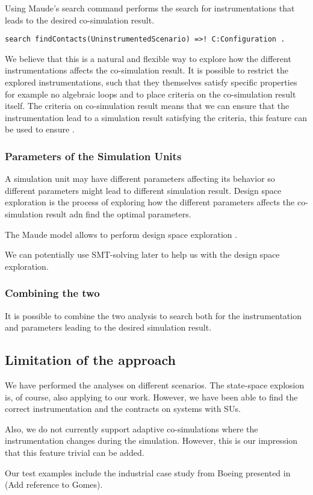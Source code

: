 Using Maude's search command performs the search for instrumentations that leads to the desired co-simulation result.

\begin{lstlisting}
search findContacts(UninstrumentedScenario) =>! C:Configuration .
\end{lstlisting}

We believe that this is a natural and flexible way to explore how the different instrumentations affects the co-simulation result.
It is possible to restrict the explored instrumentations, such that they themselves satisfy specific properties for example no algebraic loops and to place criteria on the co-simulation result itself. 
The criteria on co-simulation result means that we can ensure that the instrumentation lead to a simulation result satisfying the criteria, this feature can be used to ensure .

\subsubsection{Parameters of the Simulation Units}
A simulation unit may have different parameters affecting its behavior so different parameters might lead to different simulation result.
Design space exploration is the process of exploring how the different parameters affects the co-simulation result adn find the optimal parameters. 

The Maude model allows to perform design space exploration .

We can potentially use SMT-solving later to help us with the design space exploration.

\subsubsection{Combining the two}
It is possible to combine the two analysis to search both for the instrumentation and parameters leading to the desired simulation result.





\subsection{Limitation of the approach}
We have performed the analyses on different scenarios. 
The state-space explosion is, of course, also applying to our work. 
However, we have been able to find the correct instrumentation and the contracts on systems with  SUs.

Also, we do not currently support adaptive co-simulations  where the instrumentation changes during the simulation. 
However, this is our impression that this feature trivial can be added. 

Our test examples include the industrial case study from Boeing presented in (Add reference to Gomes). 